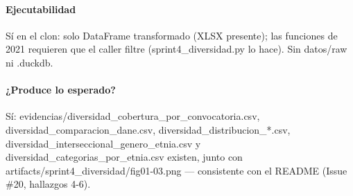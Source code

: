 \paragraph{Ejecutabilidad}
Sí en el clon: solo DataFrame transformado (XLSX presente); las funciones de 2021 requieren que el caller filtre (sprint4\_diversidad.py lo hace). Sin datos/raw ni .duckdb.

\paragraph{¿Produce lo esperado?}
Sí: evidencias/diversidad\_cobertura\_por\_convocatoria.csv, diversidad\_comparacion\_dane.csv, diversidad\_distribucion\_*.csv, diversidad\_interseccional\_genero\_etnia.csv y diversidad\_categorias\_por\_etnia.csv existen, junto con artifacts/sprint4\_diversidad/fig01-03.png --- consistente con el README (Issue \#20, hallazgos 4-6).

